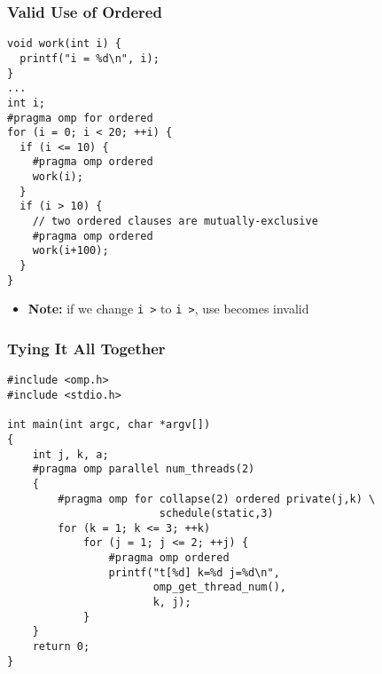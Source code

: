 \documentclass[aspectratio=43]{beamer}
\newenvironment{changemargin}[1]{%
  \begin{list}{}{%
    \setlength{\topsep}{0pt}%
    \setlength{\leftmargin}{#1}%
    \setlength{\rightmargin}{1em}
    \setlength{\listparindent}{\parindent}%
    \setlength{\itemindent}{\parindent}%
    \setlength{\parsep}{\parskip}%
  }%
  \item[]}{\end{list}}
\begin{document}
\begin{frame}[fragile]
  \frametitle{Valid Use of Ordered}

  \begin{changemargin}{2.5cm}
  \begin{lstlisting}
void work(int i) {
  printf("i = %d\n", i);
}
...
int i;
#pragma omp for ordered
for (i = 0; i < 20; ++i) {
  if (i <= 10) {
    #pragma omp ordered
    work(i);
  }
  if (i > 10) {
    // two ordered clauses are mutually-exclusive
    #pragma omp ordered
    work(i+100);
  }
}
  \end{lstlisting}
  \end{changemargin}

  \begin{changemargin}{.5cm}
  \begin{itemize}
    \item <2-> {\bf Note:} if we change {\tt i \textgreater{}} to
      {\tt i \textgreater{}}, use becomes invalid
  \end{itemize}
  \end{changemargin}


\end{frame}



\begin{frame}[fragile]
  \frametitle{Tying It All Together}

  \begin{changemargin}{1cm}
  \begin{lstlisting}
#include <omp.h>
#include <stdio.h>

int main(int argc, char *argv[])
{
    int j, k, a;
    #pragma omp parallel num_threads(2)
    {
        #pragma omp for collapse(2) ordered private(j,k) \
                        schedule(static,3)
        for (k = 1; k <= 3; ++k)
            for (j = 1; j <= 2; ++j) {
                #pragma omp ordered
                printf("t[%d] k=%d j=%d\n",
                       omp_get_thread_num(),
                       k, j);
            }
    }
    return 0;
}
  \end{lstlisting}
  \end{changemargin}

\end{frame}
\end{document}
